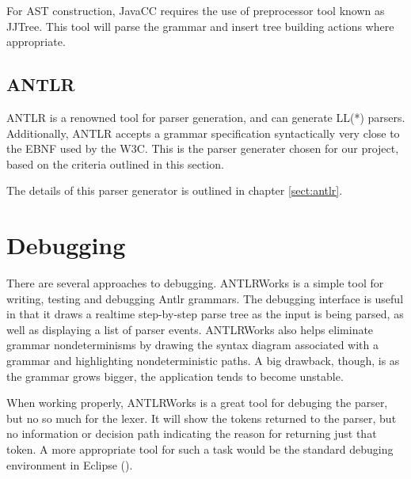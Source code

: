 For AST construction, JavaCC requires the use of preprocessor tool known as  
JJTree. This tool will parse the grammar and insert tree building actions where
appropriate. 

\subsection{ANTLR}
ANTLR is a renowned tool for parser generation, and can generate LL(*) parsers.
Additionally, ANTLR accepts a grammar specification syntactically very close to
the EBNF used by the W3C. This is the parser generater chosen for our project,
based on the criteria outlined in this section.

The details of this parser generator is outlined in chapter \ref{sect:antlr}.

\section{Debugging}
\label{sect:method:debugging}
There are several approaches to debugging. ANTLRWorks \cite{antlrwrks00} is a
simple tool for writing, testing and debugging Antlr grammars. The debugging
interface is useful in that it draws a realtime step-by-step parse tree as the
input is being parsed, as well as displaying a list of parser events.
ANTLRWorks also helps eliminate grammar nondeterminisms by drawing the syntax
diagram associated with a grammar and highlighting nondeterministic paths. A
big drawback, though, is as the grammar grows bigger, the application tends to
become unstable.    

When working properly, ANTLRWorks is a great tool for debuging the parser, but
no so much for the lexer. It will show the tokens returned to the parser, but
no information or decision path indicating the reason for returning just that
token. A more appropriate tool for such a task would be the standard debuging
environment in Eclipse (\cite{eclipse}).    
